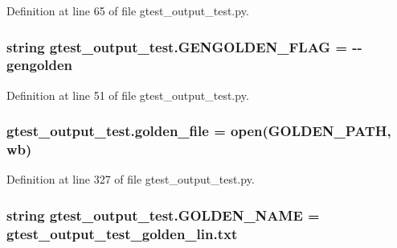 Definition at line 65 of file gtest\+\_\+output\+\_\+test.\+py.

\subsubsection[{\texorpdfstring{G\+E\+N\+G\+O\+L\+D\+E\+N\+\_\+\+F\+L\+AG}{GENGOLDEN_FLAG}}]{\setlength{\rightskip}{0pt plus 5cm}string gtest\+\_\+output\+\_\+test.\+G\+E\+N\+G\+O\+L\+D\+E\+N\+\_\+\+F\+L\+AG = \textquotesingle{}-\/-\/gengolden\textquotesingle{}}\hypertarget{namespacegtest__output__test_a25addad68fc28461f31e7f473bb7643f}{}\label{namespacegtest__output__test_a25addad68fc28461f31e7f473bb7643f}


Definition at line 51 of file gtest\+\_\+output\+\_\+test.\+py.

\subsubsection[{\texorpdfstring{golden\+\_\+file}{golden_file}}]{\setlength{\rightskip}{0pt plus 5cm}gtest\+\_\+output\+\_\+test.\+golden\+\_\+file = open({\bf G\+O\+L\+D\+E\+N\+\_\+\+P\+A\+TH}, \textquotesingle{}wb\textquotesingle{})}\hypertarget{namespacegtest__output__test_a0a02ae5e249d93c376bbce6fb87f9405}{}\label{namespacegtest__output__test_a0a02ae5e249d93c376bbce6fb87f9405}


Definition at line 327 of file gtest\+\_\+output\+\_\+test.\+py.

\subsubsection[{\texorpdfstring{G\+O\+L\+D\+E\+N\+\_\+\+N\+A\+ME}{GOLDEN_NAME}}]{\setlength{\rightskip}{0pt plus 5cm}string gtest\+\_\+output\+\_\+test.\+G\+O\+L\+D\+E\+N\+\_\+\+N\+A\+ME = \textquotesingle{}gtest\+\_\+output\+\_\+test\+\_\+golden\+\_\+lin.\+txt\textquotesingle{}}\hypertarget{namespacegtest__output__test_a317ece7d11d9103a7bdbf0320b64a981}{}\label{namespacegtest__output__test_a317ece7d11d9103a7bdbf0320b64a981}


